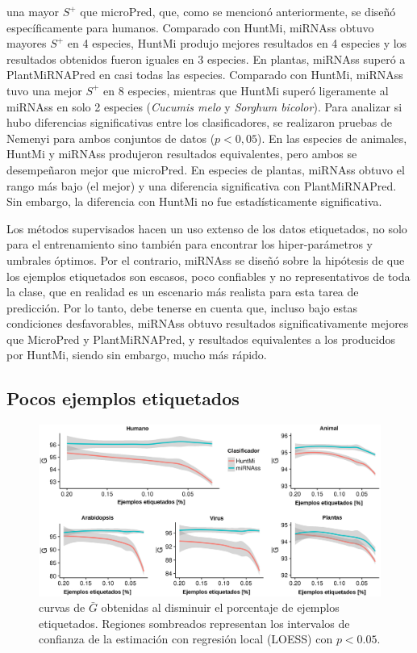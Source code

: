 una mayor $S^{+}$ que microPred, que, como se mencionó anteriormente, se diseñó específicamente para humanos. Comparado con HuntMi, miRNAss obtuvo mayores
$S^{+}$ en 4 especies, HuntMi produjo mejores resultados en 4 especies y los resultados obtenidos fueron iguales en 3 especies. En plantas, miRNAss superó a
PlantMiRNAPred en casi todas las especies. Comparado con HuntMi, miRNAss tuvo una mejor $S^{+}$ en 8 especies, mientras que HuntMi superó ligeramente al
miRNAss en solo 2 especies (\textit{Cucumis melo} y \textit{Sorghum bicolor}).
Para analizar si hubo diferencias significativas entre los clasificadores, se realizaron pruebas de Nemenyi \citep{nemenyi1962distribution} para ambos
conjuntos de datos ($ p<0,05 $). En las especies de animales, HuntMi y miRNAss produjeron resultados equivalentes, pero ambos se desempeñaron mejor que
microPred. En especies de plantas, miRNAss obtuvo el rango más bajo (el mejor) y una diferencia significativa con PlantMiRNAPred. Sin embargo, la diferencia
con HuntMi no fue estadísticamente significativa.

Los métodos supervisados hacen un uso extenso de los datos etiquetados, no solo para el entrenamiento sino también para encontrar los hiper-parámetros
y umbrales óptimos. Por el contrario, miRNAss se diseñó sobre la hipótesis de que los ejemplos etiquetados son escasos, poco confiables y no
representativos de toda la clase, que en realidad es un escenario más realista para esta tarea de predicción. Por lo tanto, debe tenerse en cuenta que,
incluso bajo estas condiciones desfavorables, miRNAss obtuvo resultados significativamente mejores que MicroPred y PlantMiRNAPred, y resultados equivalentes a
los producidos por HuntMi, siendo sin embargo, mucho más rápido.

\subsection*{Pocos ejemplos etiquetados}

\begin{figure}[t]
	\centering
	\includegraphics[width=\linewidth]{fig/few_labeled-huntmi.eps}
	\caption[$\bar{G}$ con pocos ejemplos de entrenamiento]{curvas de $\bar{G}$ obtenidas al disminuir el porcentaje de ejemplos etiquetados. Regiones
		sombreados representan los intervalos de confianza de la estimación con regresión local (LOESS) con $p < 0.05$.}
	\label{fig:fewSamples:huntmi}
\end{figure}

